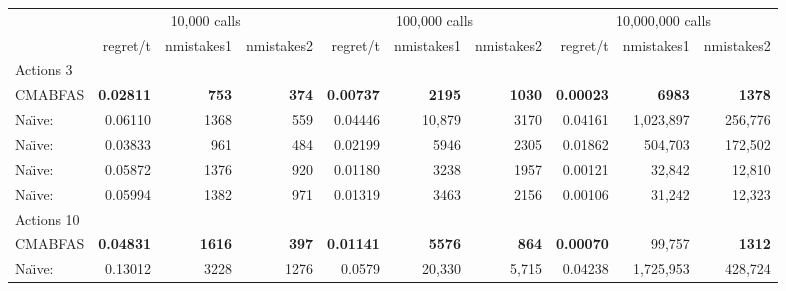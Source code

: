 \documentclass{llncs}
\begin{document}
\begin{sidewaystable}
\begin{center}
\begin{tabular}{|l|rrr|rrr|rrr|}
\hline
& \multicolumn{3}{|c|}{10,000 calls} &\multicolumn{3}{|c|}{100,000 calls} &\multicolumn{3}{|c|}{10,000,000 calls}\\
                                     & regret/t & nmistakes1 & nmistakes2 & regret/t & nmistakes1 & nmistakes2 & regret/t & nmistakes1 & nmistakes2 \\
\hline
Actions 3                            &               &           &           &               &            &            &               &            &           \\
\hspace*{0.5cm}CMABFAS                & {\bf 0.02811} & {\bf 753} & {\bf 374} & {\bf 0.00737} & {\bf 2195} & {\bf 1030} & {\bf 0.00023} & {\bf 6983} & {\bf 1378}\\
\hspace*{0.5cm}Na\"{\i}ve:      & 0.06110       & 1368      & 559       & 0.04446       & 10,879     & 3170       & 0.04161       & 1,023,897  & 256,776   \\  
\hspace*{0.5cm}Na\"{\i}ve:      & 0.03833       & 961       & 484       & 0.02199       & 5946       & 2305       & 0.01862       & 504,703    & 172,502   \\
\hspace*{0.5cm}Na\"{\i}ve:     & 0.05872       & 1376      & 920       & 0.01180       & 3238       & 1957       & 0.00121       & 32,842     & 12,810    \\
\hspace*{0.5cm}Na\"{\i}ve:     & 0.05994       & 1382      & 971       & 0.01319       & 3463       & 2156       & 0.00106       & 31,242     & 12,323    \\
\hline
Actions 10                            &               &           &           &               &            &            &               &            &            \\
\hspace*{0.5cm}CMABFAS                & {\bf 0.04831} & {\bf 1616}& {\bf 397} & {\bf 0.01141} & {\bf 5576} & {\bf 864}  & {\bf 0.00070} & 99,757     & {\bf 1312} \\
\hspace*{0.5cm}Na\"{\i}ve:      & 0.13012       & 3228      & 1276      & 0.0579        & 20,330     & 5,715      & 0.04238       & 1,725,953  & 428,724    \\

\end{tabular}
\end{center}
\end{sidewaystable}
\end{document}
